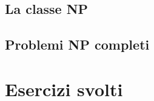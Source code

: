 \documentclass[]{article}
\begin{document}
		\subsection{La classe NP}
		\subsection{Problemi NP completi}
	\section{Esercizi svolti}
		
		
		
		
		
		
\end{document}
